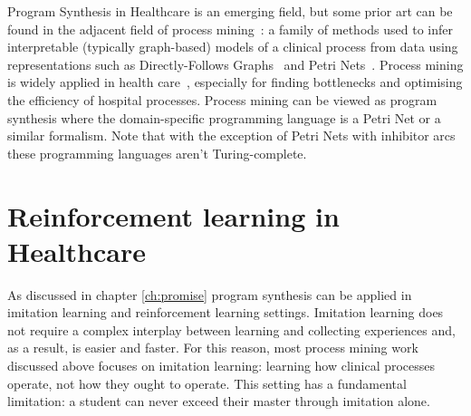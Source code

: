 Program Synthesis in Healthcare is an emerging field, but some prior art can be found in the adjacent field of process mining~\cite{reinkemeyerProcessMiningAction2020, vanderaalstProcessMining2012, vanderaalstProcessMining3602022, vanderaalstProcessMiningHandbook2022, vanderaalstProcessMiningManifesto2012, vanderaalstProcessMiningOverview2012, vanderaalstProcessMiningResearch2004}: a family of methods used to infer interpretable (typically graph-based) models of a clinical process from data using representations such as Directly-Follows Graphs~\cite{lischkaDirectlyFollowsGraphs2025, vanderaalstPractitionersGuideProcess2019} and Petri Nets~\cite{davidPetriNetsModeling1994, murataPetriNetsProperties2002, netsPetriNetsDynamic2007, petersonPetriNets1977, petriPetriNet2008, prothPetriNets1998, reisigPetriNets2011, reisigUnderstandingPetriNets2013, silvaIntroducingPetriNets1993, thongSurveyPetriNet2015, zurawskiPetriNetsIndustrial1994}. 
Process mining is widely applied in health care~\cite{aversanoProcessMiningApplications2025, batistaProcessMiningHealthcare2018, dallagassaOpportunitiesChallengesApplying2022, erdoganSystematicMappingProcess2018, ghasemiProcessMiningHealthcare2016, guzzoProcessMiningApplications2022, kaymakProcessMiningHealth2012, mansProcessMiningHealth2008, martinUsingProcessMining2022, rojasProcessMiningHealthcare2016, salasCombiningProcessMining2024}, especially for finding bottlenecks and optimising the efficiency of hospital processes. 
Process mining can be viewed as program synthesis where the domain-specific programming language is a Petri Net or a similar formalism.
Note that with the exception of Petri Nets with inhibitor arcs~\cite{busiAnalysisIssuesPetri2002, reinhardtReachabilityPetriNets2008} these programming languages aren't Turing-complete.

\newpage
\section{Reinforcement learning in Healthcare}
\label{sec:rl-health}

As discussed in chapter \ref{ch:promise} program synthesis can be applied in imitation learning and reinforcement learning settings.
Imitation learning does not require a complex interplay between learning and collecting experiences and, as a result, is easier and faster.
For this reason, most process mining work discussed above focuses on imitation learning: learning how clinical processes operate, not how they ought to operate.
This setting has a fundamental limitation: a student can never exceed their master through imitation alone.

